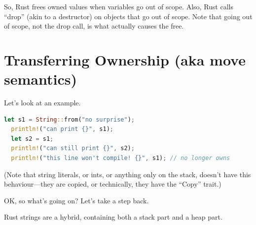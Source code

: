 \documentclass[a4paper]{report}
\begin{document}
So, Rust frees owned values when variables go out of scope. Also, Rust calls
``drop'' (akin to a destructor) on objects that go out of scope. Note that
going out of scope, not the drop call, is what actually causes the free.

\section*{Transferring Ownership (aka move semantics)}

Let's look at an example.
\begin{lstlisting}[language=Rust]
  let s1 = String::from("no surprise");
  println!("can print {}", s1);
  let s2 = s1;
  println!("can still print {}", s2);
  println!("this line won't compile! {}", s1); // no longer owns
\end{lstlisting}

(Note that string literals, or ints, or anything only on the stack,
doesn't have this behaviour---they are copied, or technically, they
have the ``Copy'' trait.)

OK, so what's going on? Let's take a step back.

Rust strings are a hybrid, containing both a stack part and a heap part.

\begin{center}
\end{center}
\end{document}

